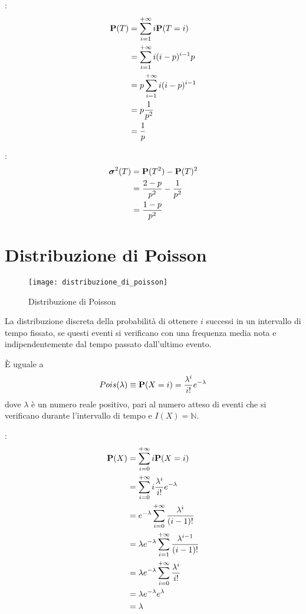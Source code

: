 :
\begin{align*}
  \mathbf{P}(T) &= \sum_{i=1}^{+ \infty} i \mathbf{P}(T = i) \\
  &= \sum_{i=1}^{+ \infty} i (i - p)^{i-1} p \\
  &= p \sum_{i=1}^{+ \infty} i (i - p)^{i-1} \\
  &= p \frac{1}{p^2} \\
  &= \frac{1}{p}
\end{align*}

:
\begin{align*}
  \boldsymbol\sigma^2(T) &= \mathbf{P}(T^2) - \mathbf{P}(T)^2 \\
  &= \frac{2-p}{p^2} - \frac{1}{p^2} \\
  &= \frac{1-p}{p^2}
\end{align*}


\section{Distribuzione di Poisson} %
\begin{figure*}
  \texttt{[image: distribuzione\_di\_poisson]}
  \caption{Distribuzione di Poisson}
\end{figure*}

\begin{definition}
  \label{def:distribuzione_di_poisson}
  La distribuzione discreta della probabilità di ottenere \( i \) successi in un intervallo di tempo fissato,
  se questi eventi si verificano con una frequenza media nota e indipendentemente dal tempo passato dall'ultimo evento.

  È uguale a
  \[ Pois(\lambda) \equiv \mathbf{P}(X = i) = \frac{\lambda^i}{i!} e^{- \lambda} \]
  dove \( \lambda \) è un numero reale positivo, pari al numero atteso di eventi che si verificano durante l'intervallo di tempo e \( I(X) = \mathbb{N} \).
\end{definition}

:
\begin{align*}
  \mathbf{P}(X) &= \sum_{i=0}^{+ \infty} i \mathbf{P}(X = i) \\
  &= \sum_{i=0}^{+ \infty} i \frac{\lambda^i}{i!} e^{- \lambda} \\
  &= e^{- \lambda} \sum_{i=0}^{+ \infty} \frac{\lambda^i}{(i-1)!} \\
  &= \lambda e^{- \lambda} \sum_{i=1}^{+ \infty} \frac{\lambda^{i-1}}{(i-1)!} \\
  &= \lambda e^{- \lambda} \sum_{i=0}^{+ \infty} \frac{\lambda^{i}}{i!} \\
  &= \lambda e^{- \lambda} e^\lambda \\
  &= \lambda
\end{align*}

